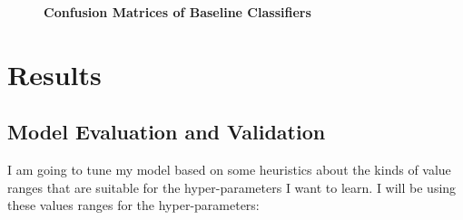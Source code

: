 \begin{figure}[!hbtp]

    \caption{\textbf{Confusion Matrices of Baseline Classifiers}}
\end{figure}



\chapter*{Results}


\section*{Model Evaluation and Validation}

I am going to tune my model based on some heuristics about the kinds of value ranges that are suitable for the hyper-parameters I want to learn. I will be using these values ranges for the hyper-parameters:

